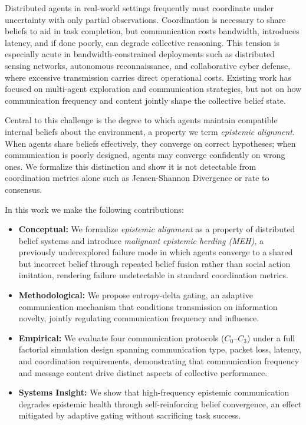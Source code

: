 \documentclass[pdflatex,sn-mathphys-num]{sn-jnl}%
\theoremstyle{thmstyleone}%
\theoremstyle{thmstyletwo}%
\theoremstyle{thmstylethree}%
\begin{document}
Distributed agents in real-world settings frequently must coordinate under uncertainty with only partial 
observations. Coordination is necessary to share beliefs to aid in task completion, but communication 
costs bandwidth, introduces latency, and if done poorly, can degrade 
collective reasoning. This tension is especially acute in bandwidth-constrained deployments such as distributed sensing networks, autonomous reconnaissance, and collaborative cyber defense, where excessive transmission carries direct operational costs. Existing work has focused on multi-agent exploration and communication strategies, but not on how communication frequency and content jointly shape the collective belief state.

Central to this challenge is the degree to which agents maintain compatible internal beliefs about the environment, a property we term \textit{epistemic alignment}. When agents share beliefs effectively, they converge on correct hypotheses; when communication is poorly designed, agents may converge confidently on wrong ones. We formalize this distinction and show it is not detectable from coordination metrics alone such as Jensen-Shannon Divergence or rate to consensus.

In this work we make the following contributions:

\begin{itemize}
    \item \textbf{Conceptual:} We formalize \textit{epistemic alignment} as a property of distributed belief systems and introduce 
    \textit{malignant epistemic herding (MEH)}, a previously underexplored failure mode in which agents converge to a shared but incorrect belief through repeated belief fusion rather than social action imitation, rendering failure undetectable in standard coordination metrics.

    \item \textbf{Methodological:} We propose entropy-delta gating, an adaptive communication mechanism that conditions transmission on information novelty, jointly regulating communication frequency and influence.

    \item \textbf{Empirical:} We evaluate four communication protocols ($C_0$--$C_3$) under a full factorial simulation design spanning communication type, packet loss, latency, and coordination requirements, demonstrating that communication frequency and message content drive distinct aspects of collective performance.

    \item \textbf{Systems Insight:} We show that high-frequency epistemic communication degrades epistemic health through self-reinforcing belief convergence, an effect mitigated by adaptive gating without sacrificing task success.
\end{itemize}
\end{document}
